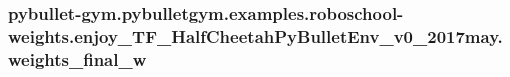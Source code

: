 \subsubsection[{\texorpdfstring{weights\+\_\+final\+\_\+w}{weights_final_w}}]{\setlength{\rightskip}{0pt plus 5cm}pybullet-\/gym.\+pybulletgym.\+examples.\+roboschool-\/weights.\+enjoy\+\_\+\+T\+F\+\_\+\+Half\+Cheetah\+Py\+Bullet\+Env\+\_\+v0\+\_\+2017may.\+weights\+\_\+final\+\_\+w}\hypertarget{namespacepybullet-gym_1_1pybulletgym_1_1examples_1_1roboschool-weights_1_1enjoy___t_f___half_cheetah_py_bullet_env__v0__2017may_a8f77699bfcdb561c965b36fa1a9901b2}{}\label{namespacepybullet-gym_1_1pybulletgym_1_1examples_1_1roboschool-weights_1_1enjoy___t_f___half_cheetah_py_bullet_env__v0__2017may_a8f77699bfcdb561c965b36fa1a9901b2}
